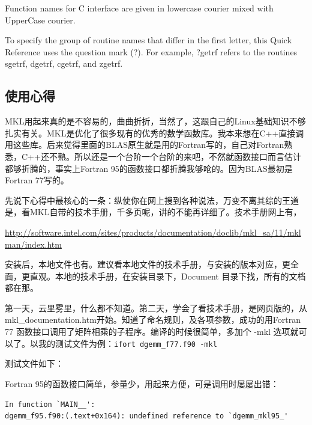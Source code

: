 Function names for C interface are given in lowercase courier mixed with UpperCase courier.

To specify the group of routine names that differ in the first letter, this Quick Reference uses the question mark (?). For example, ?getrf refers to the routines sgetrf, dgetrf, cgetrf, and zgetrf.


\subsection{使用心得}
MKL用起来真的是不容易的，曲曲折折，当然了，这跟自己的Linux基础知识不够扎实有关。MKL是优化了很多现有的优秀的数学函数库。我本来想在C++直接调用这些库。后来觉得里面的BLAS原生就是用的Fortran写的，自己对Fortran熟悉，C++还不熟。所以还是一个台阶一个台阶的来吧，不然就函数接口而言估计都够折腾的，事实上Fortran 95的函数接口都折腾我够呛的。因为BLAS最初是Fortran 77写的。

先说下心得中最核心的一条：纵使你在网上搜到各种说法，万变不离其综的王道是，看MKL自带的技术手册，千多页呢，讲的不能再详细了。技术手册网上有，

\url{http://software.intel.com/sites/products/documentation/doclib/mkl_sa/11/mklman/index.htm}

安装后，本地文件也有。建议看本地文件的技术手册，与安装的版本对应，更全面，更直观。本地的技术手册，在安装目录下，Document 目录下找，所有的文档都在那。

第一天，云里雾里，什么都不知道。第二天，学会了看技术手册，是网页版的，从mkl\_documentation.htm开始。知道了命名规则，及各项参数，成功的用Fortran 77 函数接口调用了矩阵相乘的子程序。编译的时候很简单，多加个 -mkl 选项就可以了。以我的测试文件为例：\verb|ifort dgemm_f77.f90 -mkl|

测试文件如下：


Fortran 95的函数接口简单，参量少，用起来方便，可是调用时屡屡出错：
\begin{verbatim}
In function `MAIN__':
dgemm_f95.f90:(.text+0x164): undefined reference to `dgemm_mkl95_'
\end{verbatim}

